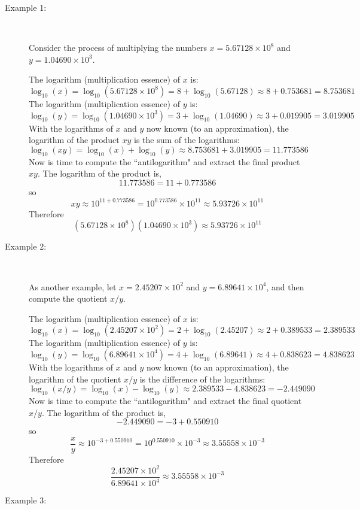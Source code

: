 \documentclass{article}
\begin{document}
\vspace{5mm}

\begin{description}
\item[Example 1:] ~

Consider the process of multiplying the numbers \(x = 5.67128 \times 10^8\) and \(y = 1.04690 \times 10^3\). 

The logarithm (multiplication essence) of \(x\) is: 
\[\log_{10}(x) = \log_{10}(5.67128 \times 10^8) = 8 + \log_{10}(5.67128) \approx 8 + 0.753681 = 8.753681\]
The logarithm (multiplication essence) of \(y\) is:
\[\log_{10}(y) = \log_{10}(1.04690 \times 10^3) = 3 + \log_{10}(1.04690) \approx 3 + 0.019905 = 3.019905\]
With the logarithms of \(x\) and \(y\) now known (to an approximation), the logarithm of the product \(xy\) is the sum of the logarithms:
\[\log_{10}(xy) = \log_{10}(x) + \log_{10}(y) \approx 8.753681 + 3.019905 = 11.773586\]
Now is time to compute the ``antilogarithm" and extract the final product \(xy\). The logarithm of the product is, 
\[11.773586 = 11 + 0.773586\]
so
\[xy \approx 10^{11 + 0.773586} = 10^{0.773586} \times 10^{11} \approx 5.93726 \times 10^{11}\]
Therefore
\[(5.67128 \times 10^8)(1.04690 \times 10^3) \approx 5.93726 \times 10^{11}\]


\item[Example 2:] ~

As another example, let \(x = 2.45207 \times 10^2\) and \(y = 6.89641 \times 10^4\), and then compute the quotient \(x/y\). 

The logarithm (multiplication essence) of \(x\) is: 
\[\log_{10}(x) = \log_{10}(2.45207 \times 10^2) = 2 + \log_{10}(2.45207) \approx 2 + 0.389533 = 2.389533\]
The logarithm (multiplication essence) of \(y\) is: 
\[\log_{10}(y) = \log_{10}(6.89641 \times 10^4) = 4 + \log_{10}(6.89641) \approx 4 + 0.838623 = 4.838623\]
With the logarithms of \(x\) and \(y\) now known (to an approximation), the logarithm of the quotient \(x/y\) is the difference of the logarithms:
\[\log_{10}(x/y) = \log_{10}(x) - \log_{10}(y) \approx 2.389533 - 4.838623 = -2.449090\]
Now is time to compute the ``antilogarithm" and extract the final quotient \(x/y\). The logarithm of the product is, 
\[-2.449090 = -3 + 0.550910\]
so
\[\frac{x}{y} \approx 10^{-3 + 0.550910} = 10^{0.550910} \times 10^{-3} \approx 3.55558 \times 10^{-3}\]
Therefore
\[\frac{2.45207 \times 10^2}{6.89641 \times 10^4} \approx 3.55558 \times 10^{-3}\]


\item[Example 3:] ~


\end{description}
\end{document}
